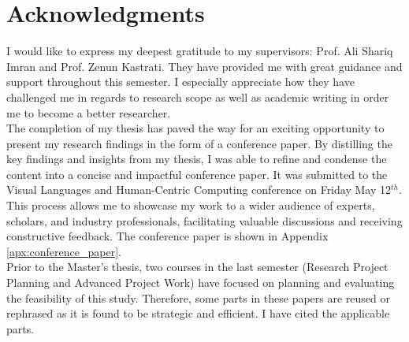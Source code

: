 \chapter*{Acknowledgments}
I would like to express my deepest gratitude to my supervisors: Prof. Ali Shariq Imran and Prof. Zenun Kastrati. They have provided me with great guidance and support throughout this semester. I especially appreciate how they have challenged me in regards to research scope as well as academic writing in order me to become a better researcher. \\

The completion of my thesis has paved the way for an exciting opportunity to present my research findings in the form of a conference paper. By distilling the key findings and insights from my thesis, I was able to refine and condense the content into a concise and impactful conference paper. It was submitted to the Visual Languages and Human-Centric Computing conference on Friday May 12$^{th}$. This process allows me to showcase my work to a wider audience of experts, scholars, and industry professionals, facilitating valuable discussions and receiving constructive feedback. The conference paper is shown in Appendix \ref{apx:conference_paper}. \\

Prior to the Master's thesis, two courses in the last semester (Research Project Planning and Advanced Project Work) have focused on planning and evaluating the feasibility of this study. Therefore, some parts in these papers are reused or rephrased as it is found to be strategic and efficient. I have cited the applicable parts. 